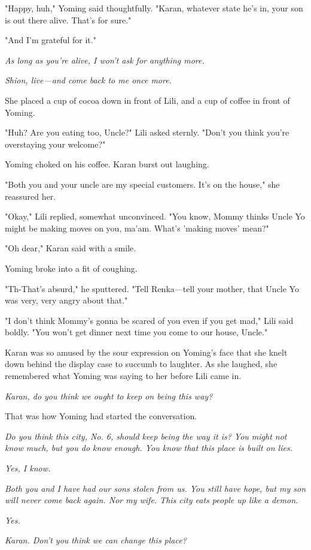 "Happy, huh," Yoming said thoughtfully. "Karan, whatever state he's in,
your son is out there alive. That's for sure."

"And I'm grateful for it."

\emph{As long as you're alive, I won't ask for anything more.}

\emph{Shion, live---and come back to me once more.}

She placed a cup of cocoa down in front of Lili, and a cup of coffee in
front of Yoming.

"Huh? Are you eating too, Uncle?" Lili asked sternly. "Don't you think
you're overstaying your welcome?"

Yoming choked on his coffee. Karan burst out laughing.

"Both you and your uncle are my special customers. It's on the house,"
she reassured her.

"Okay," Lili replied, somewhat unconvinced. "You know, Mommy thinks
Uncle Yo might be making moves on you, ma'am. What's 'making moves'
mean?"

"Oh dear," Karan said with a smile.

Yoming broke into a fit of coughing.

"Th-That's absurd," he sputtered. "Tell Renka---tell your mother, that
Uncle Yo was very, very angry about that."

"I don't think Mommy's gonna be scared of you even if you get mad," Lili
said boldly. "You won't get dinner next time you come to our house,
Uncle."

Karan was so amused by the sour expression on Yoming's face that she
knelt down behind the display case to succumb to laughter. As she
laughed, she remembered what Yoming was saying to her before Lili came
in.

\emph{Karan, do you think we ought to keep on being this way?}

That was how Yoming had started the conversation.

\emph{Do you think this city, No. 6, should keep being the way it is?
You might not know much, but you do know enough. You know that this
place is built on lies.}

\emph{Yes, I know.}

\emph{Both you and I have had our sons stolen from us. You still have
hope, but my son will never come back again. Nor my wife. This city eats
people up like a demon.}

\emph{Yes.}

\emph{Karan. Don't you think we can change this place?}

